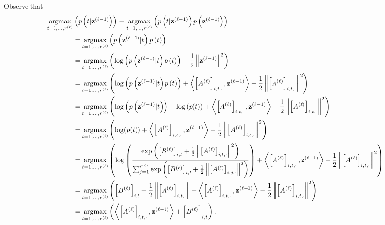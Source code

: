 \begin{tproof}
    Observe that
    \begin{align*}
        \operatorname*{\mathrm{argmax}}_{t=1,\dots,r^{(\ell)}}&\left(p\left(t\vert\mathbf{z}^{(\ell-1)}\right)\right)=\operatorname*{\mathrm{argmax}}_{t=1,\dots,r^{(\ell)}}\left(p\left(t\vert\mathbf{z}^{(\ell-1)}\right)p\left(\mathbf{z}^{(\ell-1)}\right)\right)\\&=\operatorname*{\mathrm{argmax}}_{t=1,\dots,r^{(\ell)}}\left(p\left(\mathbf{z}^{(\ell-1)}\vert t\right)p\left(t\right)\right)\\&=\operatorname*{\mathrm{argmax}}_{t=1,\dots,r^{(\ell)}}\left(\log\left(p\left(\mathbf{z}^{(\ell-1)}\vert t\right)p\left(t\right)\right)-\frac{1}{2}\left\Vert\mathbf{z}^{(\ell-1)}\right\Vert^2\right)\\&=\operatorname*{\mathrm{argmax}}_{t=1,\dots,r^{(\ell)}}\left(\log\left(p\left(\mathbf{z}^{(\ell-1)}\vert t\right)p\left(t\right)\right)+\left\langle\left[A^{(\ell)}\right]_{i,t,\cdot},\mathbf{z}^{(\ell-1)}\right\rangle-\frac{1}{2}\left\Vert\left[A^{(\ell)}\right]_{i,t,\cdot}\right\Vert^2\right)\\&=\operatorname*{\mathrm{argmax}}_{t=1,\dots,r^{(\ell)}}\left(\log\left(p\left(\mathbf{z}^{(\ell-1)}\vert t\right)\right)+\log\left(p(t)\right)+\left\langle\left[A^{(\ell)}\right]_{i,t,\cdot},\mathbf{z}^{(\ell-1)}\right\rangle-\frac{1}{2}\left\Vert\left[A^{(\ell)}\right]_{i,t,\cdot}\right\Vert^2\right)\\&=\operatorname*{\mathrm{argmax}}_{t=1,\dots,r^{(\ell)}}\left(\log(p(t))+\left\langle\left[A^{(\ell)}\right]_{i,t,\cdot},\mathbf{z}^{(\ell-1)}\right\rangle-\frac{1}{2}\left\Vert\left[A^{(\ell)}\right]_{i,t,\cdot}\right\Vert^2\right)\\&=\operatorname*{\mathrm{argmax}}_{t=1,\dots,r^{(\ell)}}\left(\log\left(\frac{\exp\left(\left[B^{(\ell)}\right]_{i,t}+\frac{1}{2}\left\Vert\left[A^{(\ell)}\right]_{i,t,\cdot}\right\Vert^2\right)}{\sum_{j=1}^{r^{(\ell)}}\exp\left(\left[B^{(\ell)}\right]_{i,t}+\frac{1}{2}\left\Vert\left[A^{(\ell)}\right]_{i,j,\cdot}\right\Vert^2\right)}\right)+\left\langle\left[A^{(\ell)}\right]_{i,t,\cdot},\mathbf{z}^{(\ell-1)}\right\rangle-\frac{1}{2}\left\Vert\left[A^{(\ell)}\right]_{i,t,\cdot}\right\Vert^2\right)\\&=\operatorname*{\mathrm{argmax}}_{t=1,\dots,r^{(\ell)}}\left(\left[B^{(\ell)}\right]_{i,t}+\frac{1}{2}\left\Vert\left[A^{(\ell)}\right]_{i,t,\cdot}\right\Vert+\left\langle\left[A^{(\ell)}\right]_{i,t,\cdot},\mathbf{z}^{(\ell-1)}\right\rangle-\frac{1}{2}\left\Vert\left[A^{(\ell)}\right]_{i,t,\cdot}\right\Vert^2\right)\\&=\operatorname*{\mathrm{argmax}}_{t=1,\dots,r^{(\ell)}}\left(\left\langle\left[A^{(\ell)}\right]_{i,t,\cdot},\mathbf{z}^{(\ell-1)}\right\rangle+\left[B^{(\ell)}\right]_{i,t}\right).
    \end{align*}
\end{tproof}

